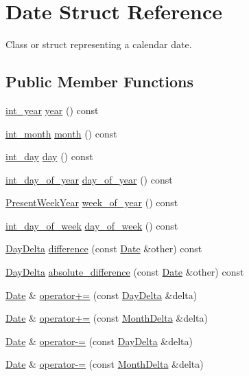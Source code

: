 \hypertarget{structDate}{\section{\-Date \-Struct \-Reference}
\label{structDate}
}


\-Class or struct representing a calendar date.  


\subsection*{\-Public \-Member \-Functions}
\begin{DoxyCompactItemize}
\item 
\hyperlink{types_8h_a7ff53e164374f5b24e06f3c04362e61d}{int\-\_\-year} \hyperlink{structDate_aac4f4635d8db0ea1a32c2f979a1a6cc0}{year} () const 
\item 
\hyperlink{types_8h_a6e77e4e37237551e3c2f808f02764cec}{int\-\_\-month} \hyperlink{structDate_a39f4a9fd570f306025f78447477e42d6}{month} () const 
\item 
\hyperlink{types_8h_a2ee09cac57b5b71a2cf76051e877f320}{int\-\_\-day} \hyperlink{structDate_ac4993265144899a83ee57cd6d54d3bff}{day} () const 
\item 
\hyperlink{types_8h_ae73cc4736210d3120e1073d94bbac092}{int\-\_\-day\-\_\-of\-\_\-year} \hyperlink{structDate_aa1aaeb37af12be4ac07337b5e4ba8206}{day\-\_\-of\-\_\-year} () const 
\item 
\hyperlink{structPresentWeekYear}{\-Present\-Week\-Year} \hyperlink{structDate_af051f922cdc105f86b92fc6d8bbdfa90}{week\-\_\-of\-\_\-year} () const 
\item 
\hyperlink{types_8h_a78b244794c680f1753a6d92eed77aeda}{int\-\_\-day\-\_\-of\-\_\-week} \hyperlink{structDate_ac85eed3a3b2d579cdc74b2af801740b0}{day\-\_\-of\-\_\-week} () const 
\item 
\hyperlink{structDayDelta}{\-Day\-Delta} \hyperlink{structDate_aaf5d0adf703c6d7d48f1742c320cb2b6}{difference} (const \hyperlink{structDate}{\-Date} \&other) const 
\item 
\hyperlink{structDayDelta}{\-Day\-Delta} \hyperlink{structDate_a99bd240acacbb056a0ece6cb604fb7e1}{absolute\-\_\-difference} (const \hyperlink{structDate}{\-Date} \&other) const 
\item 
\hyperlink{structDate}{\-Date} \& \hyperlink{structDate_a0d7e72cd689c957e981f64da5565c5cc}{operator+=} (const \hyperlink{structDayDelta}{\-Day\-Delta} \&delta)
\item 
\hyperlink{structDate}{\-Date} \& \hyperlink{structDate_a6a69c92d288794dc5f33647b7fb67d67}{operator+=} (const \hyperlink{structMonthDelta}{\-Month\-Delta} \&delta)
\item 
\hyperlink{structDate}{\-Date} \& \hyperlink{structDate_a4fd0dac9dc8aeb5dbd008717c6bc8974}{operator-\/=} (const \hyperlink{structDayDelta}{\-Day\-Delta} \&delta)
\item 
\hyperlink{structDate}{\-Date} \& \hyperlink{structDate_afe99434d7c9419d5505e9ba8ff599d05}{operator-\/=} (const \hyperlink{structMonthDelta}{\-Month\-Delta} \&delta)
\end{DoxyCompactItemize}
